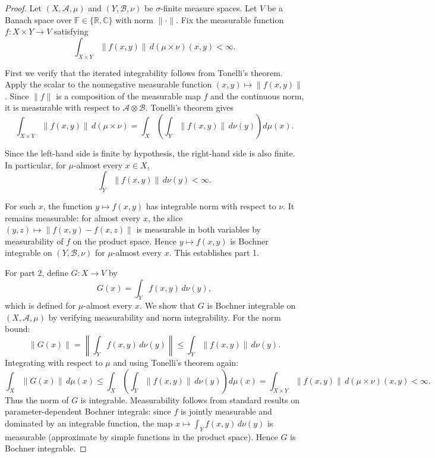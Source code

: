 \begin{proof}
Let $(X, \mathcal{A}, \mu)$ and $(Y, \mathcal{B}, \nu)$ be $\sigma$-finite measure spaces. Let $V$ be a Banach space over $\mathbb{F} \in \{\mathbb{R}, \mathbb{C}\}$ with norm $\|\cdot\|$. Fix the measurable function $f : X \times Y \to V$ satisfying
$$\int_{X \times Y} \|f(x, y)\|\,d(\mu \times \nu)(x, y) < \infty.$$

First we verify that the iterated integrability follows from Tonelli's theorem. Apply the scalar  to the nonnegative measurable function $(x, y) \mapsto \|f(x, y)\|$. Since $\|f\|$ is a composition of the measurable map $f$ and the continuous norm, it is measurable with respect to $\mathcal{A} \otimes \mathcal{B}$. Tonelli's theorem gives
$$\int_{X \times Y} \|f(x, y)\|\,d(\mu \times \nu) = \int_X \left(\int_Y \|f(x, y)\|\,d\nu(y)\right) d\mu(x).$$

Since the left-hand side is finite by hypothesis, the right-hand side is also finite. In particular, for $\mu$-almost every $x \in X$,
$$\int_Y \|f(x, y)\|\,d\nu(y) < \infty.$$

For such $x$, the function $y \mapsto f(x, y)$ has integrable norm with respect to $\nu$. It remains measurable: for almost every $x$, the slice $(y, z) \mapsto \|f(x, y) - f(x, z)\|$ is measurable in both variables by measurability of $f$ on the product space. Hence $y \mapsto f(x, y)$ is Bochner integrable on $(Y, \mathcal{B}, \nu)$ for $\mu$-almost every $x$. This establishes part 1.

For part 2, define $G : X \to V$ by
$$G(x) = \int_Y f(x, y)\,d\nu(y),$$
which is defined for $\mu$-almost every $x$. We show that $G$ is Bochner integrable on $(X, \mathcal{A}, \mu)$ by verifying measurability and norm integrability. For the norm bound:
$$\|G(x)\| = \left\|\int_Y f(x, y)\,d\nu(y)\right\| \leq \int_Y \|f(x, y)\|\,d\nu(y).$$
Integrating with respect to $\mu$ and using Tonelli's theorem again:
$$\int_X \|G(x)\|\,d\mu(x) \leq \int_X \left(\int_Y \|f(x, y)\|\,d\nu(y)\right) d\mu(x) = \int_{X \times Y} \|f(x, y)\|\,d(\mu \times \nu)(x, y) < \infty.$$
Thus the norm of $G$ is integrable. Measurability follows from standard results on parameter-dependent Bochner integrals: since $f$ is jointly measurable and dominated by an integrable function, the map $x \mapsto \int_Y f(x, y)\,d\nu(y)$ is measurable (approximate by simple functions in the product space). Hence $G$ is Bochner integrable.


\end{proof}
